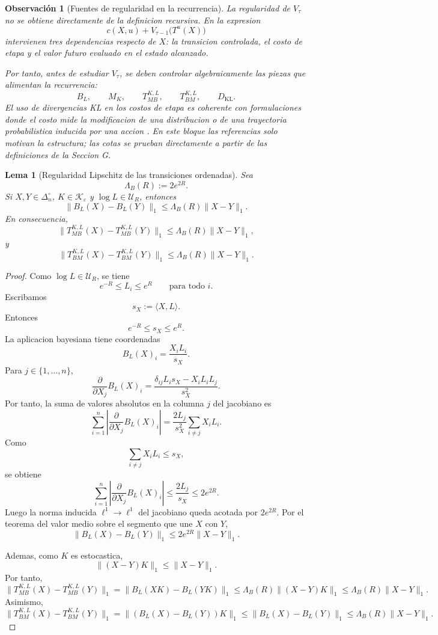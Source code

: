 ﻿\documentclass[12pt]{article}
\newtheorem{lema}{Lema}[section]
\newtheorem{observacion}{Observación}[section]
\begin{document}
\begin{observacion}[Fuentes de regularidad en la recurrencia]\label{obs:fuentes_regularidad_bellman}
La regularidad de \(V_\tau\) no se obtiene directamente de la definicion recursiva. En la expresion
\[
c(X,u)+V_{\tau-1}\bigl(T^u(X)\bigr)
\]
intervienen tres dependencias respecto de \(X\): la transicion controlada, el costo de etapa y el valor futuro evaluado en el estado alcanzado.

Por tanto, antes de estudiar \(V_\tau\), se deben controlar algebraicamente las piezas que alimentan la recurrencia:
\[
B_L,\qquad
M_K,\qquad
T_{MB}^{K,L},\qquad
T_{BM}^{K,L},
\qquad
D_{\mathrm{KL}}.
\]
El uso de divergencias KL en los costos de etapa es coherente con formulaciones donde el costo mide la modificacion de una distribucion o de una trayectoria probabilistica inducida por una accion \citep{Todorov2009EfficientComputationOptimalActions,KappenGomezOpper2012OptimalControlAsAGraphicalModelInferenceProblem}. En este bloque las referencias solo motivan la estructura; las cotas se prueban directamente a partir de las definiciones de la Seccion G.
\end{observacion}

\begin{lema}[Regularidad Lipschitz de las transiciones ordenadas]\label{lem:lipschitz_transiciones_ordenadas}
Sea
\[
\Lambda_B(R):=2e^{2R}.
\]
Si \(X,Y\in\Delta_n^\circ\), \(K\in\mathcal K_\varepsilon\) y \(\log L\in\mathcal U_R\), entonces
\[
\|B_L(X)-B_L(Y)\|_1
\le
\Lambda_B(R)\|X-Y\|_1.
\]
En consecuencia,
\[
\|T_{MB}^{K,L}(X)-T_{MB}^{K,L}(Y)\|_1
\le
\Lambda_B(R)\|X-Y\|_1,
\]
y
\[
\|T_{BM}^{K,L}(X)-T_{BM}^{K,L}(Y)\|_1
\le
\Lambda_B(R)\|X-Y\|_1.
\]
\end{lema}

\begin{proof}
Como \(\log L\in\mathcal U_R\), se tiene
\[
e^{-R}\le L_i\le e^R
\qquad
\text{para todo }i.
\]
Escribamos
\[
s_X:=\langle X,L\rangle.
\]
Entonces
\[
e^{-R}\le s_X\le e^R.
\]
La aplicacion bayesiana tiene coordenadas
\[
B_L(X)_i=\frac{X_iL_i}{s_X}.
\]
Para \(j\in\{1,\dots,n\}\),
\[
\frac{\partial}{\partial X_j}B_L(X)_i
=
\frac{\delta_{ij}L_i s_X-X_iL_iL_j}{s_X^2}.
\]
Por tanto, la suma de valores absolutos en la columna \(j\) del jacobiano es
\[
\sum_{i=1}^n
\left|
\frac{\partial}{\partial X_j}B_L(X)_i
\right|
=
\frac{2L_j}{s_X^2}\sum_{i\neq j}X_iL_i.
\]
Como
\[
\sum_{i\neq j}X_iL_i\le s_X,
\]
se obtiene
\[
\sum_{i=1}^n
\left|
\frac{\partial}{\partial X_j}B_L(X)_i
\right|
\le
\frac{2L_j}{s_X}
\le
2e^{2R}.
\]
Luego la norma inducida \(\ell^1\to\ell^1\) del jacobiano queda acotada por \(2e^{2R}\). Por el teorema del valor medio sobre el segmento que une \(X\) con \(Y\),
\[
\|B_L(X)-B_L(Y)\|_1
\le
2e^{2R}\|X-Y\|_1.
\]

Ademas, como \(K\) es estocastica,
\[
\|(X-Y)K\|_1\le \|X-Y\|_1.
\]
Por tanto,
\[
\|T_{MB}^{K,L}(X)-T_{MB}^{K,L}(Y)\|_1
=
\|B_L(XK)-B_L(YK)\|_1
\le
\Lambda_B(R)\|(X-Y)K\|_1
\le
\Lambda_B(R)\|X-Y\|_1.
\]
Asimismo,
\[
\|T_{BM}^{K,L}(X)-T_{BM}^{K,L}(Y)\|_1
=
\|(B_L(X)-B_L(Y))K\|_1
\le
\|B_L(X)-B_L(Y)\|_1
\le
\Lambda_B(R)\|X-Y\|_1.
\]
\end{proof}
\end{document}
